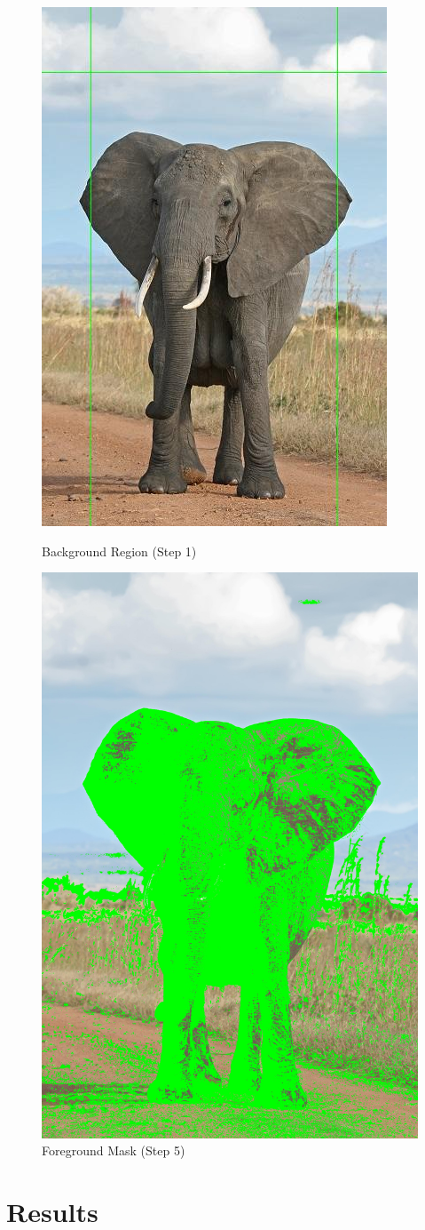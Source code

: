 \documentclass[12pt]{article}
\begin{document}
\begin{figure}[!htb]
    \begin{minipage}{0.48\textwidth}
        \centering
        \includegraphics[width=0.5\linewidth]{border.jpg}
        \caption{Background Region (Step 1)}
    \end{minipage}\hfill
    \begin{minipage}{0.48\textwidth}
        \centering
        \includegraphics[width=0.5\linewidth]{mask.jpg}
        \caption{Foreground Mask (Step 5)}
    \end{minipage}\hfill
\end{figure}

\section{Results}
\end{document}
